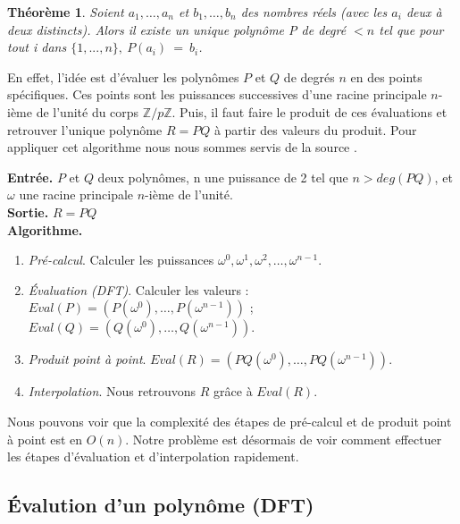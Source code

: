 \documentclass[12pt, a4paper]{article}
\begin{document}
\newtheorem{Thm1}{Théorème}
\begin{Thm1}
Soient $a_1,\dots,a_n$ et $b_1,\dots,b_n$ des nombres réels (avec les $a_i$ deux à deux distincts). Alors il existe un unique polynôme P de degré $< n$ tel que pour tout i dans $\{1,..., n\},\ P(a_i)\ =\ b_i$.
\end{Thm1}

En effet, l’idée est d’évaluer les polynômes $P$ et $Q$ de degrés $n$ en des points spécifiques. Ces points sont les puissances successives d'une racine principale $n$-ième de l'unité du corps $\mathbb{Z}/p\mathbb{Z}$. Puis, il faut faire le produit de ces évaluations et retrouver l’unique polynôme $R=PQ$ à partir des valeurs du produit. Pour appliquer cet algorithme nous nous sommes servis de la source \cite{AECF}. \\
 
\begin{tcolorbox}[colback=cyan!5!white,
                  colframe=cyan!100!black,
                  title=\textbf{Algorithme de multiplication par FFT}
                 ]
\textbf{Entrée.} $P$ et $Q$ deux polynômes, n une puissance de 2 tel que $n>deg(PQ)$, et $\omega$ une racine principale $n$-ième de l’unité. \\
\textbf{Sortie.} $R = PQ$ \\
\textbf{Algorithme.}
\begin{enumerate}[itemsep=-2ex]
\item\textit{Pré-calcul}. Calculer les puissances $\omega^0,\omega^1,\omega^2,\dots,\omega^{n-1}$. \\
\item\textit{Évaluation (DFT)}. Calculer les valeurs : \\ $Eval(P)=(P(\omega^0),\dots,P(\omega^{n-1}))$ ; $Eval(Q)=(Q(\omega^0),\dots,Q(\omega^{n-1}))$. \\
\item\textit{Produit point à point}. $Eval(R) = (PQ(\omega^0),\dots,PQ(\omega^{n-1}))$. \\
\item\textit{Interpolation}. Nous retrouvons $R$ grâce à $Eval(R)$.
\end{enumerate}
\end{tcolorbox}
Nous pouvons voir que la complexité des étapes de pré-calcul et de produit point à point est en $O(n)$. Notre problème est désormais de voir comment effectuer les étapes d'évaluation et d'interpolation rapidement.

\subsection{Évalution d'un polynôme (DFT)}
\end{document}
